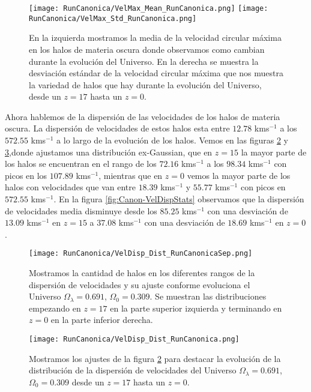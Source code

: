 \begin{figure}[H]
    \centering
    \texttt{[image: RunCanonica/VelMax\_Mean\_RunCanonica.png]}
    \texttt{[image: RunCanonica/VelMax\_Std\_RunCanonica.png]}
    \caption[Media y desviación estándar de la velocidad circular máxima]{\footnotesize En la izquierda mostramos la media de la velocidad circular máxima en los halos de materia oscura donde observamos como cambian durante la evolución del Universo. En la derecha se muestra la desviación estándar de la velocidad circular máxima que nos muestra la variedad de halos que hay durante la evolución del Universo, desde un $z=17$ hasta un $z=0$.}
    \label{fig:Canon-VelMaxStats}
\end{figure}

Ahora hablemos de la dispersión de las velocidades de los halos de materia oscura. La dispersión de velocidades de estos halos esta entre $12.78$ kms$^{-1}$ a los $572.55$ kms$^{-1}$ a lo largo de la evolución de los halos. Vemos en las figuras \ref{fig:Canon-VelDispDistSep} y \ref{fig:Canon-VelDispDist},{\morado donde ajustamos una distribución ex-Gaussian}, que en $z=15$ la mayor parte de los halos se encuentran en el rango de los $72.16$ kms$^{-1}$ a los $98.34$ kms$^{-1}$ con picos en los $107.89$ kms$^{-1}$, mientras que en $z=0$ vemos la mayor parte de los halos con velocidades que van entre $18.39$ kms$^{-1}$ y $55.77$ kms$^{-1}$ con picos en $572.55$ kms$^{-1}$. En la figura \ref{fig:Canon-VelDispStats} observamos que la dispersión de velocidades media disminuye desde los $85.25$ kms$^{-1}$ con una desviación de $13.09$ kms$^{-1}$ en $z=15$ a $37.08$ kms$^{-1}$ con una desviación de $18.69$ kms$^{-1}$ en $z=0$.

\begin{figure}[H]
    \centering
    \texttt{[image: RunCanonica/VelDisp\_Dist\_RunCanonicaSep.png]}
    \caption[Dispersión de velocidades]{\footnotesize Mostramos la cantidad de halos en los diferentes rangos de la dispersión de velocidades y su ajuste conforme evoluciona el Universo $\Omega_\lambda = 0.691 $, $\Omega_0 = 0.309$. Se muestran las distribuciones empezando en $z=17$ en la parte superior izquierda y terminando en $z=0$ en la parte inferior derecha.}
    \label{fig:Canon-VelDispDistSep}
\end{figure}

\begin{figure}[H]
    \centering
    \texttt{[image: RunCanonica/VelDisp\_Dist\_RunCanonica.png]}
    \caption[Distribución de la dispersión de velocidades]{\footnotesize Mostramos los ajustes de la figura \ref{fig:Canon-VelDispDistSep} para destacar la evolución de la distribución de la dispersión de velocidades del Universo $\Omega_\lambda = 0.691 $, $\Omega_0 = 0.309$ desde un $z=17$ hasta un $z=0$.}
    \label{fig:Canon-VelDispDist}
\end{figure}

